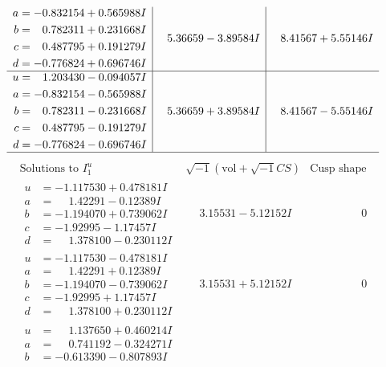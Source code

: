 \documentclass[1p]{elsarticle_modified}
\theoremstyle{definition}
\newcommand{\I}{\sqrt{-1}}
\begin{document}
$$\begin{array}{c|c|c}
\begin{aligned}
a &= -0.832154 + 0.565988 I \\
b &= \phantom{-}0.782311 + 0.231668 I \\
c &= \phantom{-}0.487795 + 0.191279 I \\
d &= -0.776824 + 0.696746 I\end{aligned}
 & \phantom{-}5.36659 - 3.89584 I & \phantom{-}8.41567 + 5.55146 I \\ \hline\begin{aligned}
u &= \phantom{-}1.203430 - 0.094057 I \\
a &= -0.832154 - 0.565988 I \\
b &= \phantom{-}0.782311 - 0.231668 I \\
c &= \phantom{-}0.487795 - 0.191279 I \\
d &= -0.776824 - 0.696746 I\end{aligned}
 & \phantom{-}5.36659 + 3.89584 I & \phantom{-}8.41567 - 5.55146 I\\
 \hline 
 \end{array}$$\newpage$$\begin{array}{c|c|c}  
\text{Solutions to }I^u_{1}& \I (\text{vol} + \sqrt{-1}CS) & \text{Cusp shape}\\
 \hline 
\begin{aligned}
u &= -1.117530 + 0.478181 I \\
a &= \phantom{-}1.42291 - 0.12389 I \\
b &= -1.194070 + 0.739062 I \\
c &= -1.92995 - 1.17457 I \\
d &= \phantom{-}1.378100 - 0.230112 I\end{aligned}
 & \phantom{-}3.15531 - 5.12152 I & \phantom{-0.000000 } 0 \\ \hline\begin{aligned}
u &= -1.117530 - 0.478181 I \\
a &= \phantom{-}1.42291 + 0.12389 I \\
b &= -1.194070 - 0.739062 I \\
c &= -1.92995 + 1.17457 I \\
d &= \phantom{-}1.378100 + 0.230112 I\end{aligned}
 & \phantom{-}3.15531 + 5.12152 I & \phantom{-0.000000 } 0 \\ \hline\begin{aligned}
u &= \phantom{-}1.137650 + 0.460214 I \\
a &= \phantom{-}0.741192 - 0.324271 I \\
b &= -0.613390 - 0.807893 I \\

\end{aligned}
\end{array}$$
\end{document}
